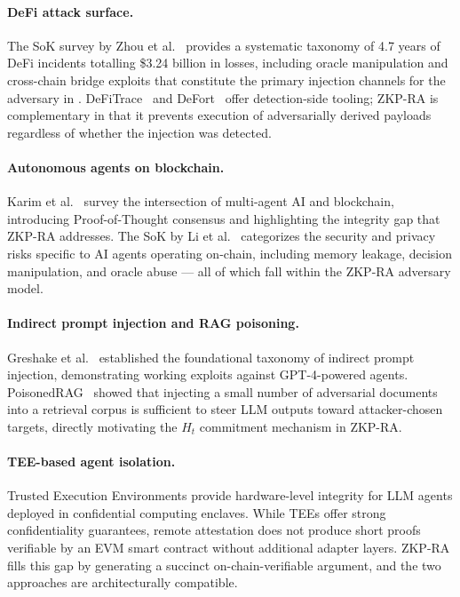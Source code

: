 \documentclass[final,5p,times,twocolumn]{elsarticle}
\theoremstyle{plain}
\theoremstyle{definition}
\theoremstyle{remark}
\begin{document}
\paragraph{DeFi attack surface.}
The SoK survey by Zhou et al.~\cite{zhou2023sokdefi} provides a systematic
taxonomy of 4.7 years of DeFi incidents totalling \$3.24 billion in losses,
including oracle manipulation and cross-chain bridge exploits that constitute the
primary injection channels for the adversary in .
DeFiTrace~\cite{defitrace2024} and DeFort~\cite{defort2024} offer detection-side
tooling; ZKP-RA is complementary in that it prevents execution of adversarially
derived payloads regardless of whether the injection was detected.

\paragraph{Autonomous agents on blockchain.}
Karim et al.~\cite{karim2025aibc} survey the intersection of multi-agent AI and
blockchain, introducing Proof-of-Thought consensus and highlighting the integrity
gap that ZKP-RA addresses. The SoK by Li et al.~\cite{sokaibc2025} categorizes
the security and privacy risks specific to AI agents operating on-chain, including
memory leakage, decision manipulation, and oracle abuse --- all of which fall
within the ZKP-RA adversary model.

\paragraph{Indirect prompt injection and RAG poisoning.}
Greshake et al.~\cite{greshake2023ipi} established the foundational taxonomy of
indirect prompt injection, demonstrating working exploits against GPT-4-powered
agents. PoisonedRAG~\cite{poisonedrag2024} showed that injecting a small number
of adversarial documents into a retrieval corpus is sufficient to steer LLM
outputs toward attacker-chosen targets, directly motivating the $H_t$ commitment
mechanism in ZKP-RA.

\paragraph{TEE-based agent isolation.}
Trusted Execution Environments provide hardware-level integrity for LLM agents
deployed in confidential computing enclaves. While TEEs offer strong confidentiality
guarantees, remote attestation does not produce short proofs verifiable by an
EVM smart contract without additional adapter layers. ZKP-RA fills this gap by
generating a succinct on-chain-verifiable argument, and the two approaches are
architecturally compatible.
\end{document}
